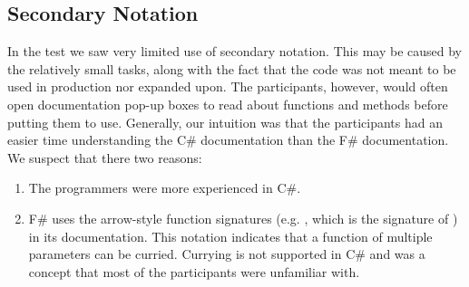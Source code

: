 \subsection{Secondary Notation}
In the test we saw very limited use of secondary notation. This may be caused by the relatively small tasks, along with the fact that the code was not meant to be used in production nor expanded upon. The participants, however, would often open documentation pop-up boxes to read about functions and methods before putting them to use. Generally, our intuition was that the participants had an easier time understanding the C\# documentation than the F\# documentation. We suspect that there two reasons:
\begin{enumerate}
    \item The programmers were more experienced in C\#.
    \item F\# uses the arrow-style function signatures (e.g. , which is the signature of ) in its documentation. This notation indicates that a function of multiple parameters can be curried. Currying is not supported in C\# and was a concept that most of the participants were unfamiliar with.
\end{enumerate}